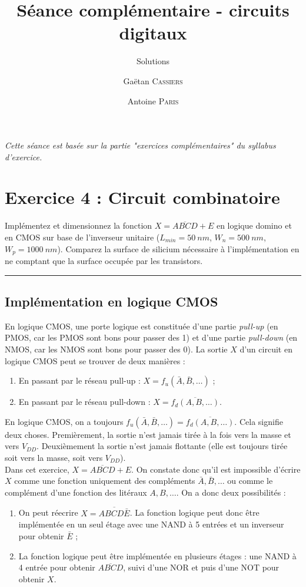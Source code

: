 \documentclass[frenchb,DIV=14]{scrartcl}
\title{Séance complémentaire - circuits digitaux}
\subtitle{Solutions}
\author{\small Gaëtan \textsc{Cassiers} \and\small Antoine \textsc{Paris}}
\date{}
\begin{document}
\maketitle

\emph{Cette séance est basée sur la partie "exercices complémentaires" du syllabus d'exercice.}

\section*{Exercice 4 : Circuit combinatoire}
Implémentez et dimensionnez la fonction $X = \overline{ABCD} + E$ en logique domino
et en CMOS sur base de l'inverseur unitaire ($L_{min}=\SI{50}{nm}$, $W_n=\SI{500}{nm}$,
$W_p=\SI{1000}{nm}$). Comparez la surface de silicium nécessaire à l'implémentation en
ne comptant que la surface occupée par les transistors.

\hspace{1cm}\hrule\hspace{1cm}

\subsection*{Implémentation en logique CMOS}
En logique CMOS, une porte logique est constituée d'une partie \emph{pull-up} (en PMOS, car
les PMOS sont bons pour passer des 1) et d'une partie \emph{pull-down} (en NMOS, car les
NMOS sont bons pour passer des 0). La sortie $X$ d'un circuit en logique CMOS peut se
trouver de deux manières :
\begin{enumerate}
	\item En passant par le réseau pull-up : $X = f_u(\bar{A}, \bar{B}, \dots)$ ;
	\item En passant par le réseau pull-down : $X = \overline{f_d(A, B, \dots)}$.
\end{enumerate}
En logique CMOS, on a toujours $f_u(\bar{A}, \bar{B}, \dots) = \overline{f_d(A, B, \dots)}$.
Cela signifie deux choses. Premièrement, la sortie n'est jamais tirée à la fois vers la 
masse et vers $V_{DD}$. Deuxièmement la sortie n'est jamais flottante (elle est toujours
tirée soit vers la masse, soit vers $V_{DD}$). \\

Dans cet exercice, $X = \overline{ABCD} + E$. On constate donc qu'il est impossible
d'écrire $X$ comme une fonction uniquement des compléments $\bar{A}, \bar{B}, \dots$
ou comme le complément d'une fonction des litéraux $A, B, \dots$. On a donc deux
possibilités :
\begin{enumerate}
	\item On peut réecrire $X = \overline{ABCD\bar{E}}$. La fonction logique peut
	donc être implémentée en un seul étage avec une NAND à 5 entrées et un inverseur
	pour obtenir $\bar{E}$ ;
	\item La fonction logique peut être implémentée en plusieurs étages : une NAND
	à 4 entrée pour obtenir $\overline{ABCD}$, suivi d'une NOR et puis d'une NOT pour
	obtenir $X$.
\end{enumerate}
\end{document}
